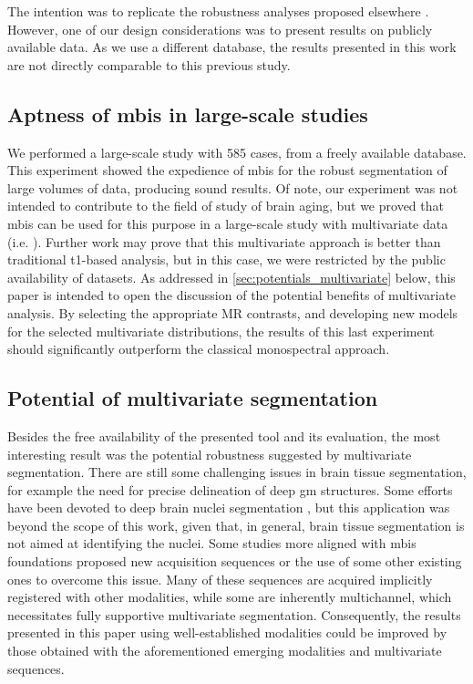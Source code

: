 The intention was to replicate the robustness analyses proposed elsewhere
  \citep{de_boer_accuracy_2010}.
However, one of our design considerations was to present results
  on publicly available data.
As we use a different database, the results presented in this work are not
  directly comparable to this previous study.
  
\subsection{Aptness of \gls*{mbis} in large-scale studies}
We performed a large-scale study with 585 cases, from a freely available database.
This experiment showed the expedience of \gls*{mbis} for the robust segmentation of large
  volumes of data, producing sound results.
Of note, our experiment was not intended to contribute to the field of study of brain aging,
  but we proved that \gls*{mbis} can be used for this purpose in a large-scale study with
  multivariate data (i.e. \citep{hodneland_automated_2012}).
Further work may prove that this multivariate approach is better than traditional \gls*{t1}-based 
  analysis, but in this case, we were restricted by the public availability of datasets.
As addressed in \autoref{sec:potentials_multivariate} below, this paper is intended to open
  the discussion of the potential benefits of multivariate analysis.
By selecting the appropriate MR contrasts, and developing new models for the selected multivariate
  distributions, the results of this last experiment should significantly outperform the classical
  monospectral approach.

\subsection{Potential of multivariate segmentation}
\label{sec:potentials_multivariate}
Besides the free availability of the presented tool and its evaluation,
  the most interesting result was the potential robustness suggested by
  multivariate segmentation.
There are still some challenging issues in brain tissue segmentation, for
  example the need for precise delineation of deep \gls*{gm} structures.
Some efforts have been devoted to deep brain nuclei segmentation 
  \citep{pohl_hierarchical_2007,tu_brain_2008}, but this
  application was beyond the scope of this work, given that, in general, brain
  tissue segmentation is not aimed at identifying the nuclei.
Some studies more aligned with \gls*{mbis} foundations proposed new acquisition
  sequences \citep{marques_mp2rage_2010,west_novel_2012} or the use of some 
  other existing ones \citep{helms_improved_2009} to overcome this issue.
Many of these sequences are acquired implicitly registered with other modalities,
  while some are inherently multichannel, which necessitates fully supportive
  multivariate segmentation.
Consequently, the results presented in this paper using well-established modalities could
  be improved by those obtained with the aforementioned emerging
  modalities and multivariate sequences.

